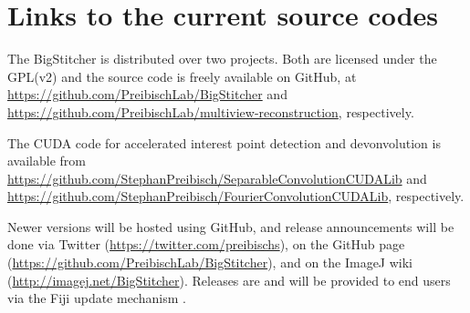 
\section{Links to the current source codes}
\label{sec:currentcode}

The BigStitcher is distributed over two projects. Both are licensed under the GPL(v2) and the source code is freely available on GitHub, at \url{https://github.com/PreibischLab/BigStitcher} and \url{https://github.com/PreibischLab/multiview-reconstruction}, respectively.

The CUDA code for accelerated interest point detection and devonvolution is available from \url{https://github.com/StephanPreibisch/SeparableConvolutionCUDALib} and \url{https://github.com/StephanPreibisch/FourierConvolutionCUDALib}, respectively.


Newer versions will be hosted using GitHub, and release announcements will be done via Twitter (\url{https://twitter.com/preibischs}), on the GitHub page (\url{https://github.com/PreibischLab/BigStitcher}), and on the ImageJ wiki (\url{http://imagej.net/BigStitcher}). Releases are and will be provided to end users via the Fiji update mechanism \cite{imagej}.

\section{}
\label{sec:bugs}

